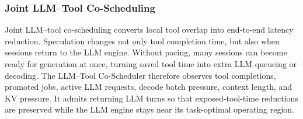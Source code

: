 \subsubsection{Joint LLM--Tool Co-Scheduling}
\label{sec:overview-coscheduling}

Joint LLM--tool co-scheduling converts local tool overlap into end-to-end latency reduction.
Speculation changes not only tool completion time, but also when sessions return to the LLM engine.
Without pacing, many sessions can become ready for generation at once, turning saved tool time into extra LLM queueing or decoding.
The LLM--Tool Co-Scheduler therefore observes tool completions, promoted jobs, active LLM requests, decode batch pressure, context length, and KV pressure.
It admits returning LLM turns so that exposed-tool-time reductions are preserved while the LLM engine stays near its task-optimal operating region.
